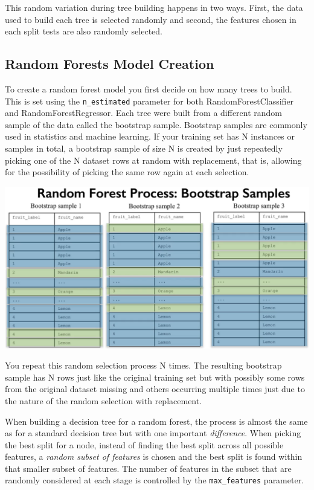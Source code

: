 \begin{multicols}{2}
This random variation during tree building happens in two ways. First, the data used to build each tree is selected randomly and second, the features chosen in each split tests are also randomly selected. 

\subsection{Random Forests Model Creation}

To create a random forest model you first decide on how many trees to build. This is set using the \texttt{n_estimated} parameter for both RandomForestClassifier and RandomForestRegressor. Each tree were built from a different random sample of the data called the bootstrap sample. Bootstrap samples are commonly used in statistics and machine learning. If your training set has N instances or samples in total, a bootstrap sample of size N is created by just repeatedly picking one of the N dataset rows at random with replacement, that is, allowing for the possibility of picking the same row again at each selection. 

\begin{center}
	\includegraphics[width=\linewidth]{img/Bootstrap-Samples.png} 
\end{center}

You repeat this random selection process N times. The resulting bootstrap sample has N rows just like the original training set but with possibly some rows from the original dataset missing and others occurring multiple times just due to the nature of the random selection with replacement. 

When building a decision tree for a random forest, the process is almost the same as for a standard decision tree but with one important \emph{difference}. When picking the best split for a node, instead of finding the best split across all possible features, a \emph{random subset of features} is chosen and the best split is found within that smaller subset of features. The number of features in the subset that are randomly considered at each stage is controlled by the \texttt{max_features} parameter. 


\end{multicols}
